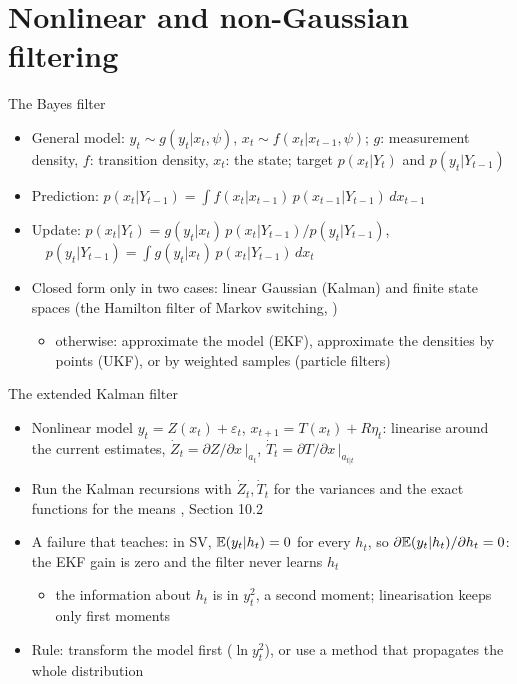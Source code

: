 \section{Nonlinear and non-Gaussian filtering}

\begin{frame}{The Bayes filter}
\itemsize{\small}
\begin{itemize}
    \item General model: $y_t \sim g(y_t | x_t, \psi)$, $x_t \sim f(x_t | x_{t-1}, \psi)$; $g$: measurement density, $f$: transition density, $x_t$: the state; target $p(x_t | Y_t)$ and $p(y_t | Y_{t-1})$
    \item Prediction: $p(x_t | Y_{t-1}) = \int f(x_t | x_{t-1})\,p(x_{t-1} | Y_{t-1})\,dx_{t-1}$
    \item Update: $p(x_t | Y_t) = g(y_t | x_t)\,p(x_t | Y_{t-1}) / p(y_t | Y_{t-1})$, $\quad p(y_t | Y_{t-1}) = \int g(y_t | x_t)\,p(x_t | Y_{t-1})\,dx_t$
    \item Closed form only in two cases: linear Gaussian (Kalman) and finite state spaces (the Hamilton filter of Markov switching, )
    \begin{itemize}
        \item otherwise: approximate the model (EKF), approximate the densities by points (UKF), or by weighted samples (particle filters)
    \end{itemize}
\end{itemize}
\end{frame}

\begin{frame}{The extended Kalman filter}
\itemsize{\small}
\begin{itemize}
    \item Nonlinear model $y_t = Z(x_t) + \varepsilon_t$, $x_{t+1} = T(x_t) + R\eta_t$: linearise around the current estimates, $\dot Z_t = \partial Z/\partial x\,|_{a_t}$, $\dot T_t = \partial T/\partial x\,|_{a_{t|t}}$
    \item Run the Kalman recursions with $\dot Z_t, \dot T_t$ for the variances and the exact functions for the means , Section 10.2
    \item A failure that teaches: in SV, $\mathbb{E}(y_t | h_t) = 0$ for every $h_t$, so $\partial\mathbb{E}(y_t | h_t)/\partial h_t = 0$: the EKF gain is zero and the filter never learns $h_t$
    \begin{itemize}
        \item the information about $h_t$ is in $y^2_t$, a second moment; linearisation keeps only first moments
    \end{itemize}
    \item Rule: transform the model first ($\ln y^2_t$), or use a method that propagates the whole distribution
\end{itemize}
\end{frame}

